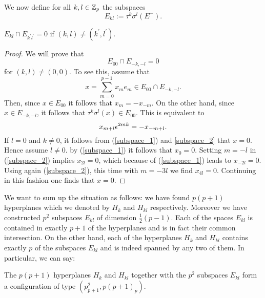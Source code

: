 We now define for all $k,l \in \mathbb{Z}_{p}$ the subspaces
\begin{equation*}
	E_{kl} := \tau^{k}\sigma^{l}(E^{-}).
\end{equation*}

\begin{lemma}
	$E_{kl} \cap E_{k^{\prime}l^{\prime}} = 0$ if $(k,l) \neq (k^{\prime}, l^{\prime})$.
\end{lemma}

\begin{proof}
	We will prove that
	\begin{equation*}
		E_{00} \cap E_{-k,-l} = 0
	\end{equation*}
	for $(k,l) \neq (0,0)$. To see this, assume that
	\begin{equation}
	\label{subspace_1}
		x = \sum_{m=0}^{p-1}x_{m}e_{m} \in E_{00}\cap E_{-k,-l}.
	\end{equation}
	Then, since $x \in E_{00}$ it follows that $x_{m} = -x_{-m}$. On the other hand, since $x \in E_{-k,-l}$, it follows that $\tau^{k}\sigma^{l}(x) \in E_{00}$. This is equivalent to
	\begin{equation}
	\label{subspace_2}
		x_{m+l}\epsilon^{2mk} = -x_{-m+l}.
	\end{equation}
	If $l = 0$ and $k\neq 0$, it follows from (\ref{subspace_1}) and \ref{subspace_2} that $x = 0$. Hence assume $l\neq 0$. by (\ref{subspace_1}) it follows that $x_{0} = 0$. Setting $m = -l$ in (\ref{subspace_2}) implies $x_{2l} = 0$, which because of (\ref{subspace_1}) leads to $x_{-2l} = 0$. Using again (\ref{subspace_2}), this time with $m = -3l$ we find $x_{4l} = 0$. Continuing in this fashion one finds that $x = 0$.
\end{proof}

We want to sum up the situation as follows: we have found $p(p+1)$ hyperplanes which we denoted by $H_{k}$ and $H_{kl}$ respectively. Moreover we have constructed $p^{2}$ subspaces $E_{kl}$ of dimension $\tfrac{1}{2}(p-1)$. Each of the spaces $E_{kl}$ is contained in exactly $p+1$ of the hyperplanes and is in fact their common intersection. On the other hand, each of the hyperplanes $H_{k}$ and $H_{kl}$ contains exactly $p$ of the subspaces $E_{kl}$ and is indeed spanned by any two of them. In particular, we can say:\\

\begin{prop}
	The $p(p+1)$ hyperplanes $H_{k}$ and $H_{kl}$ together with the $p^{2}$ subspaces $E_{kl}$ form a configuration of type $(p^{2}_{p+1}, p(p+1)_{p})$.\\
\end{prop}

